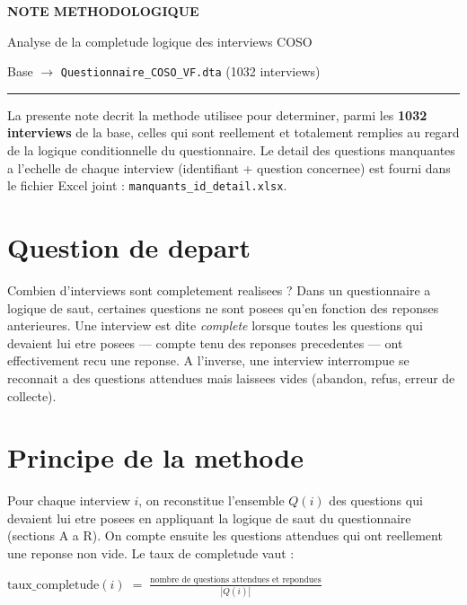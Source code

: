 \documentclass[11pt,a4paper]{article}
\begin{document}
\begin{center}
  {\LARGE\bfseries NOTE METHODOLOGIQUE\par}
  \vspace{0.4em}
  {\large Analyse de la completude logique des interviews COSO\par}
  \vspace{0.3em}
  {\normalsize Base $\rightarrow$ \texttt{Questionnaire\_COSO\_VF.dta} (1032 interviews)\par}
\end{center}
\vspace{0.6em}
\hrule
\vspace{0.8em}

La presente note decrit la methode utilisee pour determiner, parmi les
\textbf{1032 interviews} de la base, celles qui sont reellement et
totalement remplies au regard de la logique conditionnelle du questionnaire.
Le detail des questions manquantes a l'echelle de chaque interview
(identifiant + question concernee) est fourni dans le fichier Excel joint :
\texttt{manquants\_id\_detail.xlsx}.

\section{Question de depart}

Combien d'interviews sont completement realisees ? Dans un questionnaire a
logique de saut, certaines questions ne sont posees qu'en fonction des
reponses anterieures. Une interview est dite \emph{complete} lorsque toutes
les questions qui devaient lui etre posees --- compte tenu des reponses
precedentes --- ont effectivement recu une reponse. A l'inverse, une
interview interrompue se reconnait a des questions attendues mais laissees
vides (abandon, refus, erreur de collecte).

\section{Principe de la methode}

Pour chaque interview $i$, on reconstitue l'ensemble $Q(i)$ des questions
qui devaient lui etre posees en appliquant la logique de saut du
questionnaire (sections A a R). On compte ensuite les questions attendues
qui ont reellement une reponse non vide. Le taux de completude vaut :
%
\begin{center}
  $\displaystyle
  \text{taux\_completude}(i) \;=\;
  \frac{\text{nombre de questions attendues et repondues}}{|Q(i)|}
  $
\end{center}
\end{document}
